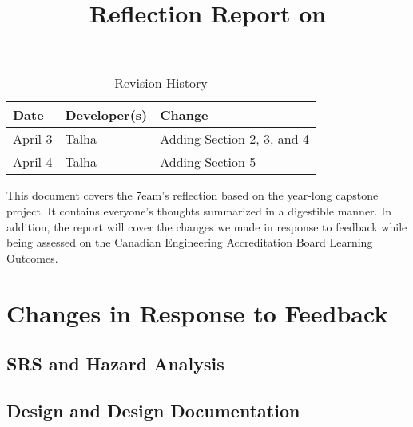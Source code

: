 \documentclass{article}
\title{Reflection Report on \progname}
\author{\authname}
\date{}
\begin{document}
\maketitle

\newpage

\tableofcontents

\newpage

\begin{table}[hp]
\caption{Revision History} \label{TblRevisionHistory}
\begin{tabularx}{\textwidth}{llX}
\toprule
\textbf{Date} & \textbf{Developer(s)} & \textbf{Change}\\
\midrule
April 3 & Talha & Adding Section 2, 3, and 4\\
April 4 & Talha & Adding Section 5\\
\bottomrule
\end{tabularx}
\end{table}

\newpage

\noindent This document covers the 7eam's reflection based on the year-long capstone project. It contains everyone's thoughts summarized in a digestible manner. In addition, the report will cover the changes we made in response to feedback while being assessed on the Canadian Engineering Accreditation Board Learning Outcomes.

\section{Changes in Response to Feedback}



\subsection{SRS and Hazard Analysis}

\subsection{Design and Design Documentation}
\end{document}
